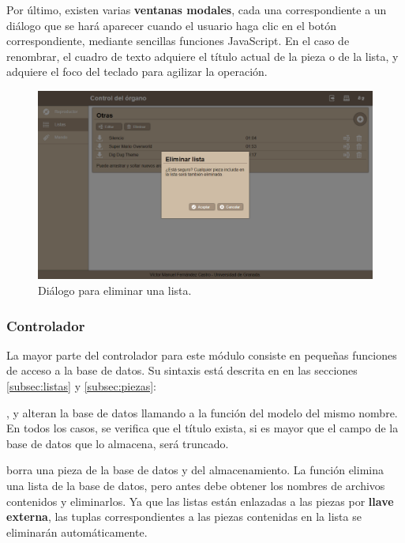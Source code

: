 Por último, existen varias \textbf{ventanas modales}, cada una correspondiente a un diálogo que se hará aparecer cuando el usuario haga clic en el botón correspondiente, mediante sencillas funciones JavaScript. En el caso de renombrar, el cuadro de texto adquiere el título actual de la pieza o de la lista, y adquiere el foco del teclado para agilizar la operación.

\smallskip

\begin{figure}[H]
	\noindent \begin{centering}
		\includegraphics[width=\linewidth*3/4]{capitulo5/cap_elim_lista}
		\par\end{centering}
	\smallskip
	\caption{\label{fig:cap_elim_lista} Diálogo para eliminar una lista.}
\end{figure} 

\smallskip

\subsubsection{Controlador}

La mayor parte del controlador para este módulo consiste en pequeñas funciones de acceso a la base de datos. Su sintaxis está descrita en en las secciones \ref{subsec:listas} y \ref{subsec:piezas}:

,  y  alteran la base de datos llamando a la función del modelo del mismo nombre. En todos los casos, se verifica que el título exista, si es mayor que el campo de la base de datos que lo almacena, será truncado.

 borra una pieza de la base de datos y del almacenamiento. La función  elimina una lista de la base de datos, pero antes debe obtener los nombres de archivos contenidos y eliminarlos. Ya que las listas están enlazadas a las piezas por \textbf{llave externa}, las tuplas correspondientes a las piezas contenidas en la lista se eliminarán automáticamente.

